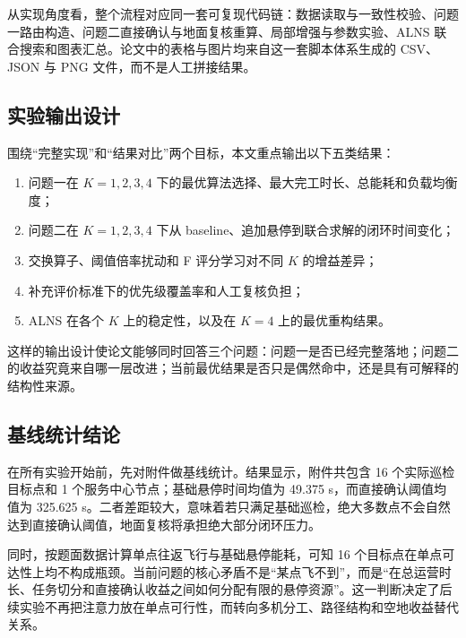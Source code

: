 \documentclass[12pt]{article}
\begin{document}
从实现角度看，整个流程对应同一套可复现代码链：数据读取与一致性校验、问题一路由构造、问题二直接确认与地面复核重算、局部增强与参数实验、ALNS 联合搜索和图表汇总。论文中的表格与图片均来自这一套脚本体系生成的 CSV、JSON 与 PNG 文件，而不是人工拼接结果。

\subsection{实验输出设计}
围绕“完整实现”和“结果对比”两个目标，本文重点输出以下五类结果：

\begin{enumerate}
	\item 问题一在 $K=1,2,3,4$ 下的最优算法选择、最大完工时长、总能耗和负载均衡度；
	\item 问题二在 $K=1,2,3,4$ 下从 baseline、追加悬停到联合求解的闭环时间变化；
	\item 交换算子、阈值倍率扰动和 F 评分学习对不同 $K$ 的增益差异；
	\item 补充评价标准下的优先级覆盖率和人工复核负担；
	\item ALNS 在各个 $K$ 上的稳定性，以及在 $K=4$ 上的最优重构结果。
\end{enumerate}

这样的输出设计使论文能够同时回答三个问题：问题一是否已经完整落地；问题二的收益究竟来自哪一层改进；当前最优结果是否只是偶然命中，还是具有可解释的结构性来源。

\subsection{基线统计结论}
在所有实验开始前，先对附件做基线统计。结果显示，附件共包含 16 个实际巡检目标点和 1 个服务中心节点；基础悬停时间均值为 49.375 s，而直接确认阈值均值为 325.625 s。二者差距较大，意味着若只满足基础巡检，绝大多数点不会自然达到直接确认阈值，地面复核将承担绝大部分闭环压力。

同时，按题面数据计算单点往返飞行与基础悬停能耗，可知 16 个目标点在单点可达性上均不构成瓶颈。当前问题的核心矛盾不是“某点飞不到”，而是“在总运营时长、任务切分和直接确认收益之间如何分配有限的悬停资源”。这一判断决定了后续实验不再把注意力放在单点可行性，而转向多机分工、路径结构和空地收益替代关系。
\end{document}
